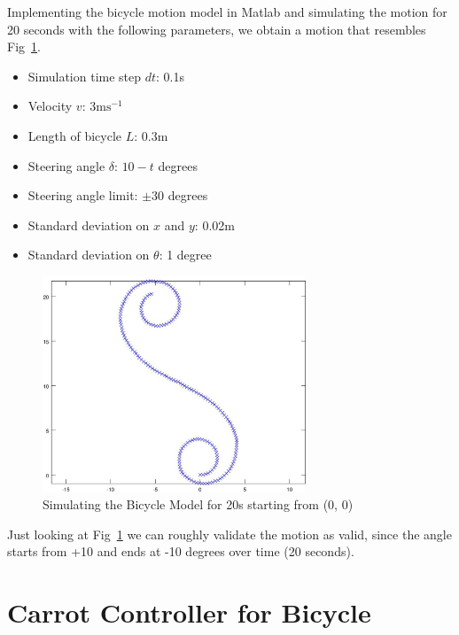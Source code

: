 \documentclass{article}
\begin{document}
Implementing the bicycle motion model in Matlab and simulating the motion for 20 seconds with the following parameters, we obtain a motion that resembles Fig~\ref{fig:bicycle_20s}.

\begin{itemize}	
	\vspace{-0.4cm}
	\setlength{\itemsep}{0pt}
	\setlength{\parskip}{0pt}
	\setlength{\parsep}{0pt}
	
	\item{Simulation time step $dt$: 0.1s}
	\item{Velocity $v$: $3 \text{ms}^{-1}$}
	\item{Length of bicycle $L$: 0.3m}
	\item{Steering angle $\delta$: $10 - t$ degrees}
	\item{Steering angle limit: $\pm 30$ degrees}
	\item{Standard deviation on $x$ and $y$: 0.02m}
	\item{Standard deviation on $\theta$: 1 degree}
\end{itemize}

\begin{figure}[H]
	\centering
	\includegraphics[width=0.7\textwidth]{images/bicycle_motion_20s.jpg}
	\caption{Simulating the Bicycle Model for 20s starting from (0, 0)}
	\label{fig:bicycle_20s}
\end{figure}

Just looking at Fig~\ref{fig:bicycle_20s} we can roughly validate the motion as valid, since the angle starts from +10 and ends at -10 degrees over time (20 seconds).





\newpage
\section{Carrot Controller for Bicycle}
\end{document}
